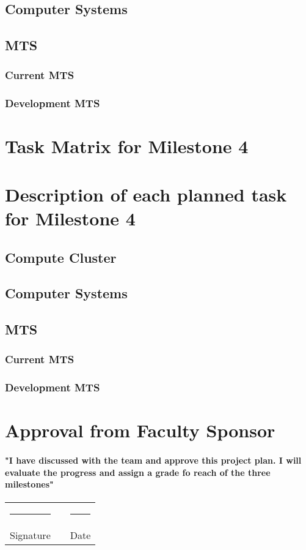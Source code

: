 \documentclass[12pt]{article}
\newcommand\tab[1][1cm]{\hspace*{#1}}
\newcommand{\doubleSignature}[2]{
	\begin{center}
		
	\end{center}
	\vspace{2cm}
	
	\noindent
	\begin{tabular}{lcl}
		\rule{7cm}{1pt} & \hspace{2cm} & \rule{3cm}{1pt} \\
		#1 & & #2
	\end{tabular}
	\vspace{1cm}
}
\begin{document}
\subsection{Computer Systems}
\subsection{MTS}
\subsubsection{Current MTS}
\subsubsection{Development MTS}
\section{Task Matrix for Milestone 4}

\section{Description of each planned task for Milestone 4}
\subsection{Compute Cluster}
\subsection{Computer Systems}
\subsection{MTS}
\subsubsection{Current MTS}
\subsubsection{Development MTS}

\section{Approval from Faculty Sponsor}
\paragraph{\tab "I have discussed with the team and approve this project plan. I will evaluate the progress and assign a grade fo reach of the three milestones"}
\doubleSignature{Signature}{Date}
\end{document}
